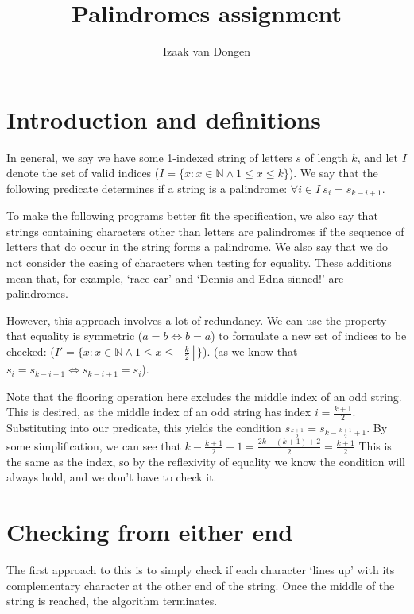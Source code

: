 \documentclass{article}
\title{Palindromes assignment}
\author{Izaak van Dongen}
\begin{document}
    \maketitle
    \tableofcontents

    \section{Introduction and definitions}

    In general, we say we have some 1-indexed string of letters $s$ of length
    $k$, and let $I$ denote the set of valid indices
    ($I = \{x: x \in \mathbb{N} \land 1 \leq x \leq k\}$).
    We say that the following predicate determines if a string is a palindrome:
    $ \forall i \in I\ s_i = s_{k - i + 1} $.

    To make the following programs better fit the specification, we also say
    that strings containing characters other than letters are palindromes if
    the sequence of letters that do occur in the string forms a palindrome. We
    also say that we do not consider the casing of characters when testing for
    equality. These additions mean that, for example, `race car' and `Dennis
    and Edna sinned!' are palindromes.

    However, this approach involves a lot of redundancy. We can use the
    property that equality is symmetric ($a = b \iff b = a$) to formulate a new
    set of indices to be checked:
    ($I' = \{x: x \in \mathbb{N} \land 1 \leq x \leq
        \left\lfloor \frac{k}{2} \right\rfloor\}$).
    (as we know that $ s_i = s_{k - i + 1} \iff s_{k - i + 1} = s_i $).

    Note that the flooring operation here excludes the middle index of an odd
    string. This is desired, as the middle index of an odd string has index
    $ i = \frac{k + 1}{2} $. Substituting into our predicate, this yields the
    condition
    $ s_{\frac{k + 1}{2}} = s_{k - \frac{k + 1}{2} + 1} $.
    By some simplification, we can see that
    $ k - \frac{k + 1}{2} + 1 = \frac{2k - (k + 1) + 2}{2} = \frac{k + 1}{2} $
    This is the same as the index, so by the reflexivity of equality we know
    the condition will always hold, and we don't have to check it.

    \section{Checking from either end}
    The first approach to this is to simply check if each character `lines up'
    with its complementary character at the other end of the string. Once the
    middle of the string is reached, the algorithm terminates.
\end{document}
